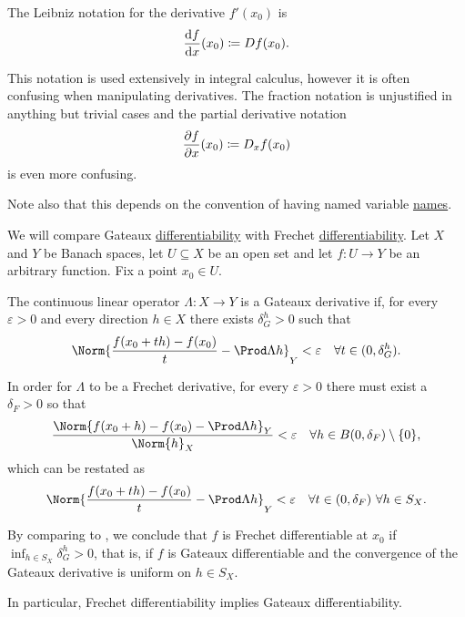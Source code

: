 \begin{remark}
\begin{RemEnum}
     The Leibniz notation for the derivative \( f'(x_0) \) is
    \begin{equation*}
      \diff f x (x_0) \coloneqq D f(x_0).
    \end{equation*}

    This notation is used extensively in integral calculus, however it is often confusing when manipulating derivatives. The fraction notation is unjustified in anything but trivial cases and the partial derivative notation
    \begin{equation*}
      \diffp f x (x_0) \coloneqq D_x f(x_0)
    \end{equation*}
    is even more confusing.

    Note also that this depends on the convention of having named variable \hyperref[def:function/argument]{names}.
  \end{RemEnum}
\end{remark}

\begin{remark}\label{rem:gateaux_vs_frechet}
  We will compare Gateaux \hyperref[def:differentiability/gateaux]{differentiability} with Frechet \hyperref[def:differentiability/frechet]{differentiability}. Let \( X \) and \( Y \) be Banach spaces, let \( U \subseteq X \) be an open set and let \( f: U \to Y \) be an arbitrary function. Fix a point \( x_0 \in U \).

  The continuous linear operator \( \Lambda: X \to Y \) is a Gateaux derivative if, for every \( \varepsilon > 0 \) and every direction \( h \in X \) there exists \( \delta_G^h > 0 \) such that
  \begin{equation}\label{rem:gateaux_vs_frechet/gateaux}
    \Norm{\frac {f(x_0 + th) - f(x_0)} t - \Prod \Lambda h}_Y < \varepsilon \quad\forall t \in (0, \delta_G^h).
  \end{equation}

  In order for \( \Lambda \) to be a Frechet derivative, for every \( \varepsilon > 0 \) there must exist a \( \delta_F > 0 \) so that
  \begin{equation*}
    \frac{\Norm{f(x_0 + h) - f(x_0) - \Prod \Lambda h}_Y} {\Norm{h}_X} < \varepsilon \quad\forall h \in B(0, \delta_F) \setminus \{ 0 \},
  \end{equation*}
  which can be restated as
  \begin{equation}\label{rem:gateaux_vs_frechet/frechet}
    \Norm{\frac {f(x_0 + th) - f(x_0)} t - \Prod \Lambda h}_Y < \varepsilon \quad\forall t \in (0, \delta_F) \ \forall h \in S_X.
  \end{equation}

  By comparing  to , we conclude that \( f \) is Frechet differentiable at \( x_0 \) if \( \inf_{h \in S_X} \delta^h_G > 0 \), that is, if \( f \) is Gateaux differentiable and the convergence of the Gateaux derivative is uniform on \( h \in S_X \).

  In particular, Frechet differentiability implies Gateaux differentiability.
\end{remark}
